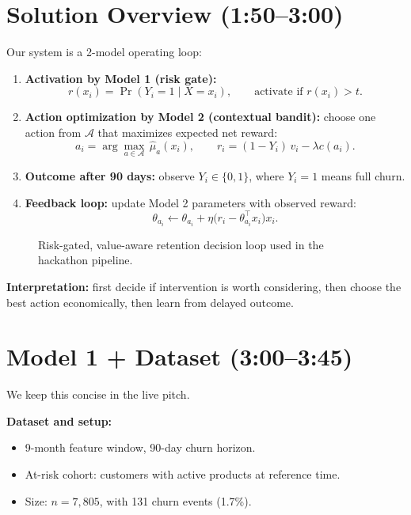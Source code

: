 \documentclass[11pt,a4paper]{article}
\begin{document}
\section{Solution Overview (1:50--3:00)}
Our system is a 2-model operating loop:
\begin{enumerate}
    \item \textbf{Activation by Model 1 (risk gate):}
    \[
    r(x_i) = \Pr(Y_i=1\mid X=x_i), \qquad \text{activate if } r(x_i) > t.
    \]
    \item \textbf{Action optimization by Model 2 (contextual bandit):}
    choose one action from $\mathcal{A}$ that maximizes expected net reward:
    \[
    a_i=\arg\max_{a\in\mathcal{A}}\,\hat\mu_a(x_i),
    \qquad
    r_i=(1-Y_i)\,v_i-\lambda c(a_i).
    \]
    \item \textbf{Outcome after 90 days:}
    observe $Y_i\in\{0,1\}$, where $Y_i=1$ means full churn.
    \item \textbf{Feedback loop:}
    update Model 2 parameters with observed reward:
    \[
    \theta_{a_i}\leftarrow\theta_{a_i}+\eta\big(r_i-\theta_{a_i}^\top x_i\big)x_i.
    \]
\end{enumerate}

\begin{figure}[htbp]
\centering
{}
\caption{Risk-gated, value-aware retention decision loop used in the hackathon pipeline.}
\end{figure}

\textbf{Interpretation:} first decide if intervention is worth considering, then choose the best action economically, then learn from delayed outcome.

\section{Model 1 + Dataset (3:00--3:45)}
We keep this concise in the live pitch.

\textbf{Dataset and setup:}
\begin{itemize}
    \item 9-month feature window, 90-day churn horizon.
    \item At-risk cohort: customers with active products at reference time.
    \item Size: $n=7{,}805$, with 131 churn events (1.7\%).
\end{itemize}
\end{document}
